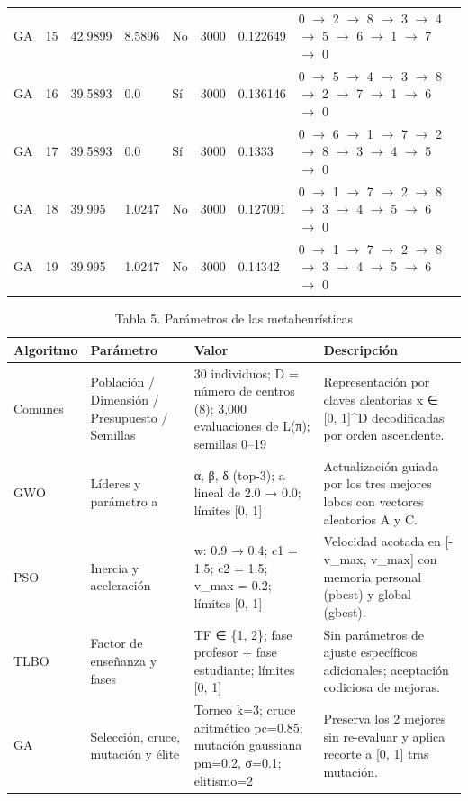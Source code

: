 \begin{table}[htbp]
\begin{tabular}{llllllll}
    GA & 15 & 42.9899 & 8.5896 & No & 3000 & 0.122649 & 0 $\rightarrow$ 2 $\rightarrow$ 8 $\rightarrow$ 3 $\rightarrow$ 4 $\rightarrow$ 5 $\rightarrow$ 6 $\rightarrow$ 1 $\rightarrow$ 7 $\rightarrow$ 0 \\
    GA & 16 & 39.5893 & 0.0 & Sí & 3000 & 0.136146 & 0 $\rightarrow$ 5 $\rightarrow$ 4 $\rightarrow$ 3 $\rightarrow$ 8 $\rightarrow$ 2 $\rightarrow$ 7 $\rightarrow$ 1 $\rightarrow$ 6 $\rightarrow$ 0 \\
    GA & 17 & 39.5893 & 0.0 & Sí & 3000 & 0.1333 & 0 $\rightarrow$ 6 $\rightarrow$ 1 $\rightarrow$ 7 $\rightarrow$ 2 $\rightarrow$ 8 $\rightarrow$ 3 $\rightarrow$ 4 $\rightarrow$ 5 $\rightarrow$ 0 \\
    GA & 18 & 39.995 & 1.0247 & No & 3000 & 0.127091 & 0 $\rightarrow$ 1 $\rightarrow$ 7 $\rightarrow$ 2 $\rightarrow$ 8 $\rightarrow$ 3 $\rightarrow$ 4 $\rightarrow$ 5 $\rightarrow$ 6 $\rightarrow$ 0 \\
    GA & 19 & 39.995 & 1.0247 & No & 3000 & 0.14342 & 0 $\rightarrow$ 1 $\rightarrow$ 7 $\rightarrow$ 2 $\rightarrow$ 8 $\rightarrow$ 3 $\rightarrow$ 4 $\rightarrow$ 5 $\rightarrow$ 6 $\rightarrow$ 0 \\
    \bottomrule
  \end{tabular}
\end{table}

\begin{table}[htbp]
  \centering
  \caption{Tabla 5. Parámetros de las metaheurísticas}
  \label{tab:tabla-5-parametros-metaheuristicas}
  \begin{tabular}{llll}
    \toprule
    Algoritmo & Parámetro & Valor & Descripción \\
    \midrule
    Comunes & Población / Dimensión / Presupuesto / Semillas & 30 individuos; D = número de centros (8); 3,000 evaluaciones de L(π); semillas 0–19 & Representación por claves aleatorias x ∈ [0, 1]\textasciicircum{}D decodificadas por orden ascendente. \\
    GWO & Líderes y parámetro a & α, β, δ (top-3); a lineal de 2.0 → 0.0; límites [0, 1] & Actualización guiada por los tres mejores lobos con vectores aleatorios A y C. \\
    PSO & Inercia y aceleración & w: 0.9 → 0.4; c1 = 1.5; c2 = 1.5; v\_max = 0.2; límites [0, 1] & Velocidad acotada en [-v\_max, v\_max] con memoria personal (pbest) y global (gbest). \\
    TLBO & Factor de enseñanza y fases & TF ∈ \{1, 2\}; fase profesor + fase estudiante; límites [0, 1] & Sin parámetros de ajuste específicos adicionales; aceptación codiciosa de mejoras. \\
    GA & Selección, cruce, mutación y élite & Torneo k=3; cruce aritmético pc=0.85; mutación gaussiana pm=0.2, σ=0.1; elitismo=2 & Preserva los 2 mejores sin re-evaluar y aplica recorte a [0, 1] tras mutación. \\
    \bottomrule
  \end{tabular}
\end{table}

